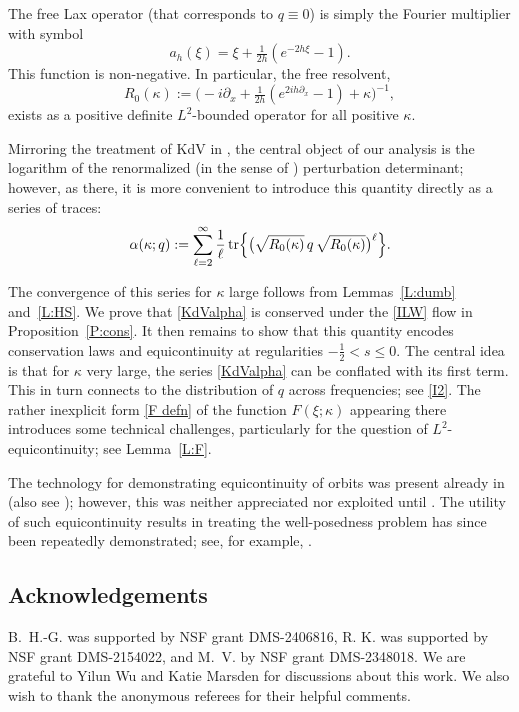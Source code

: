\documentclass{amsart}
\DeclareMathOperator{\tr}{tr}
\theoremstyle{definition}
\theoremstyle{remark}
\begin{document}
The free Lax operator (that corresponds to $q\equiv 0$) is simply the Fourier multiplier with symbol
\begin{equation}\label{symbol}
a_h(\xi) = \xi+ \tfrac1{2h}(e^{-2h\xi}-1).
\end{equation}
This function is non-negative.
In particular, the free resolvent,
$$
R_0(\kappa):=\bigl(-i\partial_x + \tfrac1{2h}(e^{2ih\partial_x}-1)+ \kappa\bigr)^{-1},
$$
exists as a positive definite $L^2$-bounded operator for all positive $\kappa$.

Mirroring the treatment of KdV in \cite{KVZ}, the central object of our analysis is the logarithm of the renormalized (in the sense of \cite{Hilbert}) perturbation determinant; however, as there, it is more convenient to introduce this quantity directly as a series of traces:
\begin{align}\label{KdValpha}
\alpha(\kappa;q) := \sum_{\ell=2}^\infty \frac{1}{\ell} \tr\Bigl\{ \bigl( \sqrt{R_0(\kappa)}\, q\, \sqrt{R_0(\kappa)}\bigr)^\ell \Bigr\}.
\end{align}

The convergence of this series for $\kappa$ large follows from Lemmas~\ref{L:dumb} and~\ref{L:HS}.  We prove that \eqref{KdValpha} is conserved under the \eqref{ILW} flow in Proposition~\ref{P:cons}.  It then remains to show that this quantity encodes conservation laws and equicontinuity at regularities $-\frac12<s\leq 0$.  The central idea is that for $\kappa$ very large, the series \eqref{KdValpha} can be conflated with its first term.  This in turn connects to the distribution of $q$ across frequencies; see \eqref{I2}.  The rather inexplicit form \eqref{F defn} of the function $F(\xi;\kappa)$ appearing there introduces some technical challenges, particularly for the question of $L^2$-equicontinuity; see Lemma~\ref{L:F}.

The technology for demonstrating equicontinuity of orbits was present already in \cite{KVZ} (also see \cite{KT}); however, this was neither appreciated nor exploited until \cite{KV}.  The utility of such equicontinuity results in treating the well-posedness problem has since been repeatedly demonstrated; see, for example, \cite{BKV:KdV5,Forlano,HKVZ,HGKV:NLS,HGKNV:DNLS,KLV,KLV:CCM,KNV,KKL,KV}. 

\subsection*{Acknowledgements} B.~H.-G. was supported by NSF grant DMS-2406816, R. K. was supported by NSF grant DMS-2154022, and M.~V. by NSF grant DMS-2348018.  We are grateful to Yilun Wu and Katie Marsden for discussions about this work.  We also wish to thank the anonymous referees for their helpful comments.
\end{document}
